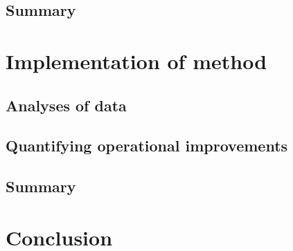 	\subsection{Summary}
\section{Implementation of method}
	\subsection{Analyses of data}
	\subsection{Quantifying operational improvements}
	\subsection{Summary}
\section{Conclusion}